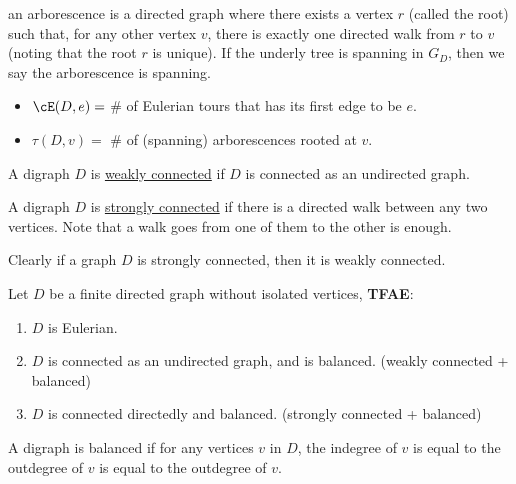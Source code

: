 \begin{definition}
	an arborescence is a directed graph where there exists a vertex $r$ (called the root) such that, for any other vertex $v$, there is exactly one directed walk from $r$ to $v$ (noting that the root $r$ is unique). If the underly tree is spanning in \( G_D \), then we say the arborescence is spanning.
\end{definition}

\begin{definition}
	\leavevmode
	\begin{itemize}
		\item \( \cE (D,e) = \) \# of Eulerian tours that has its first edge to be \( e \).
		\item \( \tau (D,v) =  \) \# of (spanning) arborescences rooted at \( v \).
	\end{itemize}
\end{definition}

\begin{definition}
	A digraph \( D \) is \underline{weakly connected} if \( D \) is connected as an undirected graph.
\end{definition}

\begin{definition}
	A digraph \( D \) is \underline{strongly connected} if there is a directed walk between any two vertices. Note that a walk goes from one of them to the other is enough.
\end{definition}

\begin{note}
	Clearly if a graph \( D \) is strongly connected, then it is weakly connected.
\end{note}

\begin{lemma}
	Let \( D \) be a finite directed graph without isolated vertices, \textbf{TFAE}:
	\begin{enumerate}
		\item \( D \) is Eulerian.
		\item \( D \) is connected as an undirected graph, and is balanced. (weakly connected + balanced)
		\item \( D \) is connected directedly and balanced. (strongly connected + balanced)
	\end{enumerate}
	A digraph is balanced if for any vertices \( v \) in \( D \), the indegree of \( v \) is equal to the outdegree of \( v \) is equal to the outdegree of \( v \).
\end{lemma}

